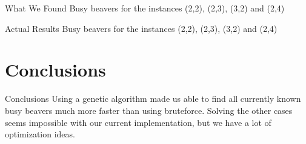 \documentclass{beamer}
\begin{document}
\begin{frame}{What We Found}
Busy beavers for the instances (2,2), (2,3), (3,2) and (2,4)
\end{frame}

\begin{frame}{Actual Results}
Busy beavers for the instances (2,2), (2,3), (3,2) and (2,4)
\end{frame}

\section{Conclusions}

\begin{frame}{Conclusions}
Using a genetic algorithm made us able to find all currently known busy beavers much more faster than using bruteforce.
Solving the other cases seems impossible with our current implementation, but we have a lot of optimization ideas.
\end{frame}
\end{document}
